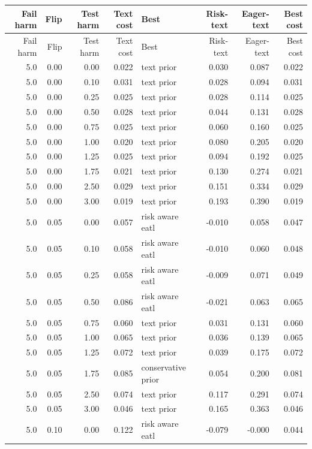 \begin{longtable}{rrrrlrrr}
\toprule
Fail harm & Flip & Test harm & Text cost & Best & Risk-text & Eager-text & Best cost \\
\midrule
\endfirsthead
\toprule
Fail harm & Flip & Test harm & Text cost & Best & Risk-text & Eager-text & Best cost \\
\midrule
\endhead
5.0 & 0.00 & 0.00 & 0.022 & text prior & 0.030 & 0.087 & 0.022 \\
5.0 & 0.00 & 0.10 & 0.031 & text prior & 0.028 & 0.094 & 0.031 \\
5.0 & 0.00 & 0.25 & 0.025 & text prior & 0.028 & 0.114 & 0.025 \\
5.0 & 0.00 & 0.50 & 0.028 & text prior & 0.044 & 0.131 & 0.028 \\
5.0 & 0.00 & 0.75 & 0.025 & text prior & 0.060 & 0.160 & 0.025 \\
5.0 & 0.00 & 1.00 & 0.020 & text prior & 0.080 & 0.205 & 0.020 \\
5.0 & 0.00 & 1.25 & 0.025 & text prior & 0.094 & 0.192 & 0.025 \\
5.0 & 0.00 & 1.75 & 0.021 & text prior & 0.130 & 0.274 & 0.021 \\
5.0 & 0.00 & 2.50 & 0.029 & text prior & 0.151 & 0.334 & 0.029 \\
5.0 & 0.00 & 3.00 & 0.019 & text prior & 0.193 & 0.390 & 0.019 \\
5.0 & 0.05 & 0.00 & 0.057 & risk aware eatl & -0.010 & 0.058 & 0.047 \\
5.0 & 0.05 & 0.10 & 0.058 & risk aware eatl & -0.010 & 0.060 & 0.048 \\
5.0 & 0.05 & 0.25 & 0.058 & risk aware eatl & -0.009 & 0.071 & 0.049 \\
5.0 & 0.05 & 0.50 & 0.086 & risk aware eatl & -0.021 & 0.063 & 0.065 \\
5.0 & 0.05 & 0.75 & 0.060 & text prior & 0.031 & 0.131 & 0.060 \\
5.0 & 0.05 & 1.00 & 0.065 & text prior & 0.036 & 0.139 & 0.065 \\
5.0 & 0.05 & 1.25 & 0.072 & text prior & 0.039 & 0.175 & 0.072 \\
5.0 & 0.05 & 1.75 & 0.085 & conservative prior & 0.054 & 0.200 & 0.081 \\
5.0 & 0.05 & 2.50 & 0.074 & text prior & 0.117 & 0.291 & 0.074 \\
5.0 & 0.05 & 3.00 & 0.046 & text prior & 0.165 & 0.363 & 0.046 \\
5.0 & 0.10 & 0.00 & 0.122 & risk aware eatl & -0.079 & -0.000 & 0.044 \\

\end{longtable}
